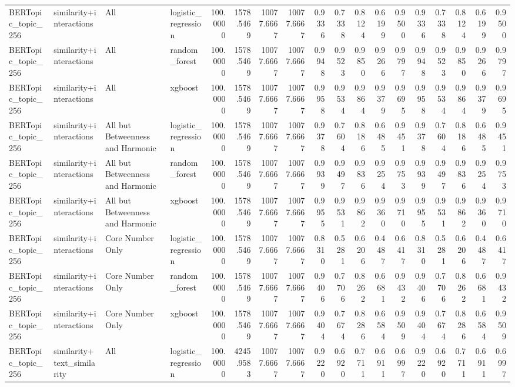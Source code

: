\begin{tabular}{llllrrrrrrrrrrrrrr}
BERTopic_topic_256 & similarity+interactions & All & logistic_regression & 100.0000 & 1578.5469 & 10077.6667 & 10077.6667 & 0.9336 & 0.7338 & 0.8124 & 0.6199 & 0.9500 & 0.9336 & 0.7338 & 0.8124 & 0.6199 & 0.9500 \\
BERTopic_topic_256 & similarity+interactions & All & random_forest & 100.0000 & 1578.5469 & 10077.6667 & 10077.6667 & 0.9948 & 0.9523 & 0.9850 & 0.9266 & 0.9797 & 0.9948 & 0.9523 & 0.9850 & 0.9266 & 0.9797 \\
BERTopic_topic_256 & similarity+interactions & All & xgboost & 100.0000 & 1578.5469 & 10077.6667 & 10077.6667 & 0.9958 & 0.9534 & 0.9864 & 0.9379 & 0.9695 & 0.9958 & 0.9534 & 0.9864 & 0.9379 & 0.9695 \\
BERTopic_topic_256 & similarity+interactions & All but Betweenness and Harmonic & logistic_regression & 100.0000 & 1578.5469 & 10077.6667 & 10077.6667 & 0.9378 & 0.7604 & 0.8186 & 0.6485 & 0.9451 & 0.9378 & 0.7604 & 0.8186 & 0.6485 & 0.9451 \\
BERTopic_topic_256 & similarity+interactions & All but Betweenness and Harmonic & random_forest & 100.0000 & 1578.5469 & 10077.6667 & 10077.6667 & 0.9939 & 0.9497 & 0.9836 & 0.9254 & 0.9753 & 0.9939 & 0.9497 & 0.9836 & 0.9254 & 0.9753 \\
BERTopic_topic_256 & similarity+interactions & All but Betweenness and Harmonic & xgboost & 100.0000 & 1578.5469 & 10077.6667 & 10077.6667 & 0.9955 & 0.9531 & 0.9862 & 0.9360 & 0.9710 & 0.9955 & 0.9531 & 0.9862 & 0.9360 & 0.9710 \\
BERTopic_topic_256 & similarity+interactions & Core Number Only & logistic_regression & 100.0000 & 1578.5469 & 10077.6667 & 10077.6667 & 0.8310 & 0.5281 & 0.6206 & 0.4487 & 0.6417 & 0.8310 & 0.5281 & 0.6206 & 0.4487 & 0.6417 \\
BERTopic_topic_256 & similarity+interactions & Core Number Only & random_forest & 100.0000 & 1578.5469 & 10077.6667 & 10077.6667 & 0.9406 & 0.7706 & 0.8262 & 0.6681 & 0.9432 & 0.9406 & 0.7706 & 0.8262 & 0.6681 & 0.9432 \\
BERTopic_topic_256 & similarity+interactions & Core Number Only & xgboost & 100.0000 & 1578.5469 & 10077.6667 & 10077.6667 & 0.9404 & 0.7674 & 0.8286 & 0.6584 & 0.9509 & 0.9404 & 0.7674 & 0.8286 & 0.6584 & 0.9509 \\
BERTopic_topic_256 & similarity+text_similarity & All & logistic_regression & 100.0000 & 4245.9583 & 10077.6667 & 10077.6667 & 0.9220 & 0.6920 & 0.7711 & 0.6911 & 0.6997 & 0.9220 & 0.6920 & 0.7711 & 0.6911 & 0.6997 \\

\end{tabular}
